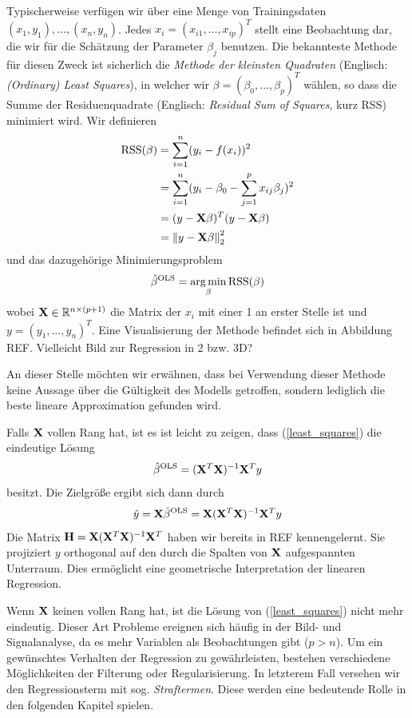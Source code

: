 Typischerweise verfügen wir über eine Menge von Trainingsdaten $(x_1, y_1), \ldots, (x_n, y_n)$. Jedes $x_i = (x_{i1}, \ldots, x_{ip})^T$ stellt eine Beobachtung dar, die wir für die Schätzung der Parameter $\beta_j$ benutzen. Die bekannteste Methode für diesen Zweck ist sicherlich die \textit{Methode der kleinsten Quadraten} (Englisch: \textit{(Ordinary) Least Squares}), in welcher wir $\beta = (\beta_0, \ldots, \beta_p)^T$ wählen, so dass die Summe der Residuenquadrate (Englisch: \textit{Residual Sum of Squares}, kurz RSS) minimiert wird. Wir definieren
\begin{align}
\label{RSS}
\text{RSS}(\beta) & = \sum_{i=1}^{n}(y_i - f(x_i))^2\\
& = \sum_{i=1}^{n}(y_i - \beta_0 - \sum_{j=1}^p x_{ij}\beta_j)^2\\
& = (y - \mathbf{X} \beta)^T(y-\mathbf{X} \beta)\\
& = \left\lVert y - \mathbf{X} \beta \right\rVert_{2}^{2}
\end{align}
und das dazugehörige Minimierungsproblem
\begin{align}
\label{least_squares}
\hat{\beta}^{\text{OLS}} = \operatorname*{arg\,min}_{\beta} \text{RSS}(\beta)
\end{align}
wobei $\mathbf{X} \in \mathbb{R}^{n \times (p+1)}$ die Matrix der $x_i$ mit einer 1 an erster Stelle ist und $y = (y_1, \ldots, y_n)^T$. Eine Visualisierung der Methode befindet sich in Abbildung REF. Vielleicht Bild zur Regression in 2 bzw. 3D?

An dieser Stelle möchten wir erwähnen, dass bei Verwendung dieser Methode keine Aussage über die Gültigkeit des Modells getroffen, sondern lediglich die beste lineare Approximation gefunden wird.

Falls $\mathbf{X}$ vollen Rang hat, ist es ist leicht zu zeigen, dass (\ref{least_squares}) die eindeutige Lösung
\begin{align}
\hat{\beta}^{\text{OLS}} = (\mathbf{X}^T\mathbf{X})^{-1}\mathbf{X}^T y
\end{align}
besitzt. Die Zielgröße ergibt sich dann durch
\begin{align}
\hat{y} = \mathbf{X} \hat{\beta}^{\text{OLS}} = \mathbf{X} (\mathbf{X}^T\mathbf{X})^{-1}\mathbf{X}^T y
\end{align}
Die Matrix $\mathbf{H} = \mathbf{X} (\mathbf{X}^T\mathbf{X})^{-1}\mathbf{X}^T$ haben wir bereits in REF kennengelernt. Sie projiziert $y$ orthogonal auf den durch  die Spalten von $\mathbf{X}$ aufgespannten Unterraum. Dies ermöglicht eine geometrische Interpretation der linearen Regression.

Wenn $\mathbf{X}$ keinen vollen Rang hat, ist die Lösung von (\ref{least_squares}) nicht mehr eindeutig. Dieser Art Probleme ereignen sich häufig in der Bild- und Signalanalyse, da es mehr Variablen als Beobachtungen gibt ($p > n$). Um ein gewünschtes Verhalten der Regression zu gewährleisten, bestehen verschiedene Möglichkeiten der Filterung oder Regularisierung. In letzterem Fall versehen wir den Regressionsterm mit sog. \textit{Straftermen}. Diese werden eine bedeutende Rolle in den folgenden Kapitel spielen.

